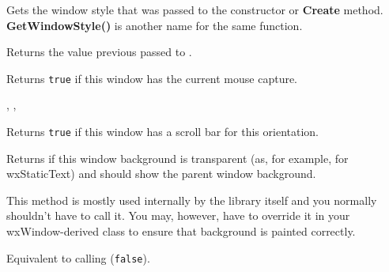 
Gets the window style that was passed to the constructor or {\bf Create}
method. {\bf GetWindowStyle()} is another name for the same function.


\label{wxwindowgetwindowvariant}


Returns the value previous passed to
.


\label{wxwindowhascapture}


Returns {\tt true} if this window has the current mouse capture.


,
,


\label{wxwindowhasscrollbar}


Returns {\tt true} if this window has a scroll bar for this orientation.




\label{wxwindowhastransparentbackground}


Returns \true if this window background is transparent (as, for example, for
wxStaticText) and should show the parent window background.

This method is mostly used internally by the library itself and you normally
shouldn't have to call it. You may, however, have to override it in your
wxWindow-derived class to ensure that background is painted correctly.


\label{wxwindowhide}


Equivalent to calling ({\tt false}).


